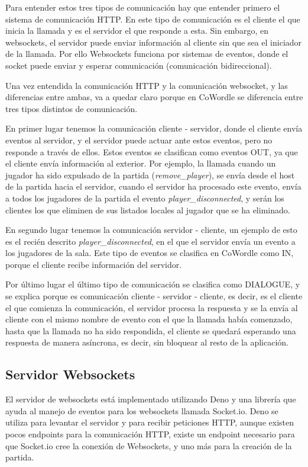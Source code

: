 Para entender estos tres tipos de comunicación hay que entender primero el sistema de comunicación HTTP. En este tipo de comunicación es el cliente el que inicia la llamada y es el servidor el que responde a esta. Sin embargo, en websockets, el servidor puede enviar información al cliente sin que sea el iniciador de la llamada. Por ello Websockets funciona por sistemas de eventos, donde el socket puede enviar y esperar comunicación (comunicación bidireccional).

Una vez entendida la comunicación HTTP y la comunicación websocket, y las diferencias entre ambas, va a quedar claro porque en CoWordle se diferencia entre tres tipos distintos de comunicación.

En primer lugar tenemos la comunicación cliente - servidor, donde el cliente envía eventos al servidor, y el servidor puede actuar ante estos eventos, pero no responde a través de ellos. 
Estos eventos se clasifican como eventos OUT, ya que el cliente envía información al exterior. Por ejemplo, la llamada cuando un jugador ha sido expulsado de la partida (\textit{remove\_player}), se envía desde el host de la partida hacia el servidor, cuando el servidor ha procesado este evento, envía a todos los jugadores de la partida el evento \textit{player\_disconnected}, y serán los clientes los que eliminen de sus listados locales al jugador que se ha eliminado.

En segundo lugar tenemos la comunicación servidor - cliente, un ejemplo de esto es el recién descrito \textit{player\_disconnected}, en el que el servidor envía un evento a los jugadores de la sala. Este tipo de eventos se clasifica en CoWordle como IN, porque el cliente recibe información del servidor.

Por último lugar el último tipo de comunicación se clasifica como DIALOGUE, y se explica porque es comunicación cliente - servidor - cliente, es decir, es el cliente el que comienza la comunicación, el servidor procesa la respuesta y se la envía al cliente con el mismo nombre de evento con el que la llamada había comenzado, hasta que la llamada no ha sido respondida, el cliente se quedará esperando una respuesta de manera asíncrona, es decir, sin bloquear al resto de la aplicación.

\subsection{Servidor Websockets}
El servidor de websockets está implementado utilizando Deno y una librería que ayuda al manejo de eventos para los websockets llamada Socket.io. Deno se utiliza para levantar el servidor y para recibir peticiones HTTP, aunque existen pocos endpoints para la comunicación HTTP, existe un endpoint necesario para que Socket.io cree la conexión de Websockets, y uno más para la creación de la partida.


